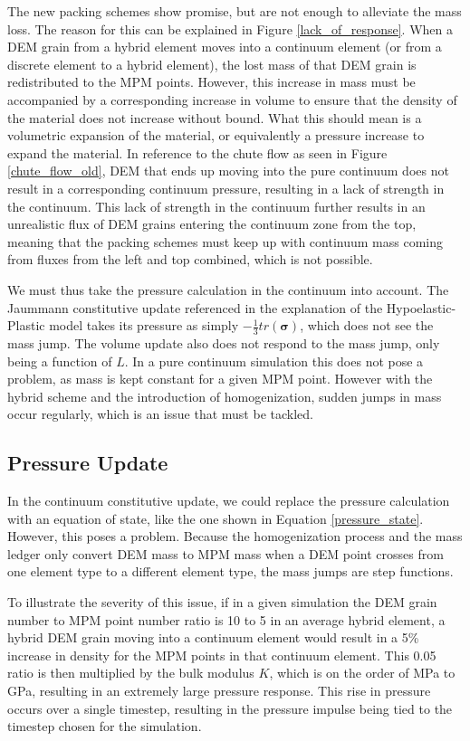 The new packing schemes show promise, but are not enough to alleviate the mass loss. The reason for this can be explained in Figure \ref{lack_of_response}. When a DEM grain from a hybrid element moves into a continuum element (or from a discrete element to a hybrid element), the lost mass of that DEM grain is redistributed to the MPM points. However, this increase in mass must be accompanied by a corresponding increase in volume to ensure that the density of the material does not increase without bound. What this should mean is a volumetric expansion of the material, or equivalently a pressure increase to expand the material. In reference to the chute flow as seen in Figure \ref{chute_flow_old}, DEM that ends up moving into the pure continuum does not result in a corresponding continuum pressure, resulting in a lack of strength in the continuum. This lack of strength in the continuum further results in an unrealistic flux of DEM grains entering the continuum zone from the top, meaning that the packing schemes must keep up with continuum mass coming from fluxes from the left and top combined, which is not possible.

We must thus take the pressure calculation in the continuum into account. The Jaummann constitutive update referenced in the explanation of the Hypoelastic-Plastic model takes its pressure as simply $-\frac{1}{3}tr(\bm{\sigma})$, which does not see the mass jump. The volume update also does not respond to the mass jump, only being a function of $L$. In a pure continuum simulation this does not pose a problem, as mass is kept constant for a given MPM point. However with the hybrid scheme and the introduction of homogenization, sudden jumps in mass occur regularly, which is an issue that must be tackled. 

\subsection{Pressure Update}
In the continuum constitutive update, we could replace the pressure calculation with an equation of state, like the one shown in Equation \ref{pressure_state}. However, this poses a problem. Because the homogenization process and the mass ledger only convert DEM mass to MPM mass when a DEM point crosses from one element type to a different element type, the mass jumps are step functions.

To illustrate the severity of this issue, if in a given simulation the DEM grain number to MPM point number ratio is 10 to 5 in an average hybrid element, a hybrid DEM grain moving into a continuum element would result in a 5\% increase in density for the MPM points in that continuum element. This 0.05 ratio is then multiplied by the bulk modulus $K$, which is on the order of MPa to GPa, resulting in an extremely large pressure response. This rise in pressure occurs over a single timestep, resulting in the pressure impulse being tied to the timestep chosen for the simulation.

